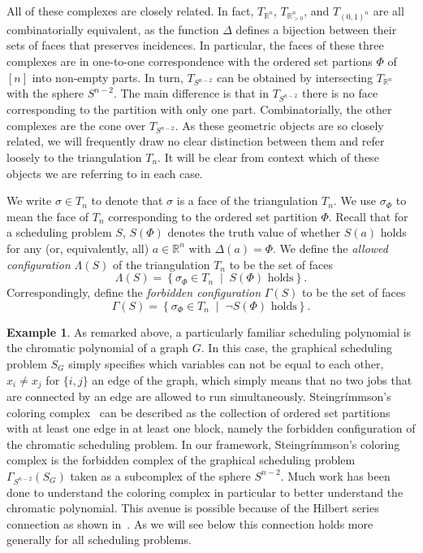 \documentclass[12pt,reqno]{amsart}
\numberwithin{definition}{section}
\theoremstyle{definition}
\newtheorem{example}[definition]{Example}
\newcommand{\RR}{\mathbb{R}}
\newcommand{\mset}[2]{ \left\{ #1 \; \middle| \; #2 \right\}}
\newcommand{\T}{T} %
\newcommand{\Tn}{T_n} %
\newcommand{\TRn}{\T_{\RR^n}} %
\newcommand{\TS}{\T_{S^{n-2}}} %
\newcommand{\TP}{\T_{\RR^n_{> 0}}} %
\newcommand{\TC}{\T_{(0,1)^n}} %
\newcommand{\allow}{\Lambda} %
\newcommand{\forb}{\Gamma} %
\newcommand{\forbS}{\forb_{S^{n-2}}} %
\begin{document}
All of these complexes are closely related. In fact, $\TRn$, $\TP$, and $\TC$ are all combinatorially equivalent, as the function $\Delta$ defines a bijection between their sets of faces that preserves incidences. In particular, the faces of these three complexes are in one-to-one correspondence with the ordered set partions $\Phi$ of $[n]$ into non-empty parts. In turn, $\TS$ can be obtained by intersecting $\TRn$ with the sphere $S^{n-2}$. The main difference is that in $\TS$ there is no face corresponding to the partition with only one part. Combinatorially, the other complexes are the cone over $\TS$. As these geometric objects are so closely related, we will frequently draw no clear distinction between them and refer loosely to the triangulation $\Tn$. It will be clear from context which of these objects we are referring to in each case.

We write $\sigma\in\Tn$ to denote that $\sigma$ is a face of the triangulation $\Tn$. We use $\sigma_\Phi$ to mean the face of $\Tn$ corresponding to the ordered set partition $\Phi$.  Recall that for a scheduling problem $S$, $S(\Phi)$ denotes the truth value of whether $S(a)$ holds for any (or, equivalently, all) $a\in\RR^n$ with $\Delta(a)=\Phi$. We define the \emph{allowed configuration} $\allow(S)$ of the triangulation $\Tn$ to be the set of faces 
\[
  \allow(S) = \mset{\sigma_\Phi \in \Tn}{S(\Phi) \textrm{ holds}}.
\]
Correspondingly, define the \emph{forbidden configuration} $\forb(S)$ to be the set of faces
\[
  \forb(S) = \mset{\sigma_\Phi \in \Tn}{\neg S(\Phi) \textrm{ holds}}.
\]



\begin{example} As remarked above, a particularly familiar scheduling polynomial is the chromatic polynomial of a graph $G$.  In this case, the graphical scheduling problem $S_G$ simply specifies which variables can not be equal to each other, $x_i \neq x_j$ for $\{i,j\}$ an edge of the graph, which simply means that no two jobs that are connected by an edge are allowed to run simultaneously.   Steingr\'{i}mmson's coloring complex~\cite{Ein} can be described as
the collection of ordered set partitions with at least one edge in at least one block, namely 
the forbidden configuration of the chromatic scheduling problem. In our framework, Steingr\'{i}mmson's coloring complex is the forbidden complex of the graphical scheduling problem $\forbS(S_G)$ taken as a subcomplex of the sphere $S^{n-2}$.
Much work has been done to understand the coloring complex in particular to better understand the chromatic polynomial.  This avenue is possible because of the Hilbert series connection as shown in~\cite{Ein}.  As we will see below this connection holds more generally for all scheduling problems.
\end{example}
\end{document}
